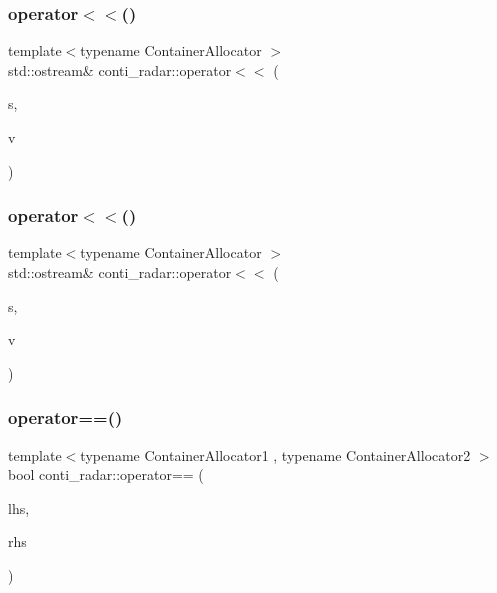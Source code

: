 \subsubsection{\texorpdfstring{operator$<$$<$()}{operator<<()}\hspace{0.1cm}{\footnotesize\ttfamily [1/2]}}
{\footnotesize\ttfamily template$<$typename Container\+Allocator $>$ \\
std\+::ostream\& conti\+\_\+radar\+::operator$<$$<$ (\begin{DoxyParamCaption}\item[{std\+::ostream \&}]{s,  }\item[{const \+::\hyperlink{structconti__radar_1_1Measurement__}{conti\+\_\+radar\+::\+Measurement\+\_\+}$<$ Container\+Allocator $>$ \&}]{v }\end{DoxyParamCaption})}

\mbox{\label{namespaceconti__radar_a45fbce01f8d975cd105ce47904567933}} 
\subsubsection{\texorpdfstring{operator$<$$<$()}{operator<<()}\hspace{0.1cm}{\footnotesize\ttfamily [2/2]}}
{\footnotesize\ttfamily template$<$typename Container\+Allocator $>$ \\
std\+::ostream\& conti\+\_\+radar\+::operator$<$$<$ (\begin{DoxyParamCaption}\item[{std\+::ostream \&}]{s,  }\item[{const \+::\hyperlink{structconti__radar_1_1ContiRadar__}{conti\+\_\+radar\+::\+Conti\+Radar\+\_\+}$<$ Container\+Allocator $>$ \&}]{v }\end{DoxyParamCaption})}

\mbox{\label{namespaceconti__radar_a51b035c16eb15a241d4ef92bc689932a}} 
\subsubsection{\texorpdfstring{operator==()}{operator==()}\hspace{0.1cm}{\footnotesize\ttfamily [1/2]}}
{\footnotesize\ttfamily template$<$typename Container\+Allocator1 , typename Container\+Allocator2 $>$ \\
bool conti\+\_\+radar\+::operator== (\begin{DoxyParamCaption}\item[{const \+::\hyperlink{structconti__radar_1_1Measurement__}{conti\+\_\+radar\+::\+Measurement\+\_\+}$<$ Container\+Allocator1 $>$ \&}]{lhs,  }\item[{const \+::\hyperlink{structconti__radar_1_1Measurement__}{conti\+\_\+radar\+::\+Measurement\+\_\+}$<$ Container\+Allocator2 $>$ \&}]{rhs }\end{DoxyParamCaption})}

